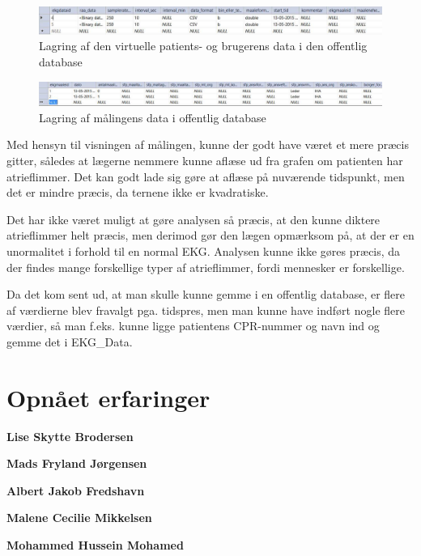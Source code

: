 \begin{figure}[H]
	\centering
	\includegraphics[width=1\textwidth]{Figurer/Snip20150525_28}
	\caption{Lagring af den virtuelle patients- og brugerens data i den offentlig database}
\end{figure}

\begin{figure}[H]
	\centering
	\includegraphics[width=1\textwidth]{Figurer/Snip20150525_29}
	\caption{Lagring af målingens data i offentlig database}
\end{figure}

Med hensyn til visningen af målingen, kunne der godt have været et mere præcis gitter, således at lægerne nemmere kunne aflæse ud fra grafen om patienten har atrieflimmer. Det kan godt lade sig gøre at aflæse på nuværende tidspunkt, men det er mindre præcis, da ternene ikke er kvadratiske.

Det har ikke været muligt at gøre analysen så præcis, at den kunne diktere atrieflimmer helt præcis, men derimod gør den lægen opmærksom på, at der er en unormalitet i forhold til en normal EKG. Analysen kunne ikke gøres præcis, da der findes mange forskellige typer af atrieflimmer, fordi mennesker er forskellige.

Da det kom sent ud, at man skulle kunne gemme i en offentlig database, er flere af værdierne blev fravalgt pga. tidspres, men man kunne have indført nogle flere værdier, så man f.eks. kunne ligge patientens CPR-nummer og navn ind og gemme det i EKG\_Data.


\section{Opnået erfaringer}
\textbf{Lise Skytte Brodersen}

\textbf{Mads Fryland Jørgensen}

\textbf{Albert Jakob Fredshavn}

\textbf{Malene Cecilie Mikkelsen}

\textbf{Mohammed Hussein Mohamed}

